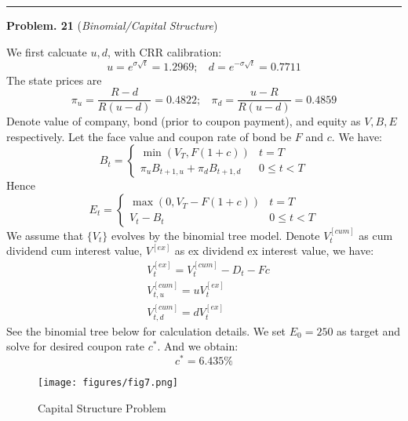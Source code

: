 \documentclass[10 pt]{hwtemplate} %
\begin{document}
\noindent\rule{16cm}{0.4pt}
\textbf{Problem. 21} (\textit{Binomial/Capital Structure})\\
\begin{solution}
We first calcuate $u,d$, with CRR calibration:
\begin{equation}
  u = e^{\sigma \sqrt{t}}=1.2969;~~~~d = e^{-\sigma \sqrt{t}}=0.7711
\end{equation}
The state prices are
\begin{equation}
  \pi_u = \frac{R-d}{R(u-d)} = 0.4822;~~~~  \pi_d = \frac{u-R}{R(u-d)} = 0.4859
\end{equation}
Denote value of company, bond (prior to coupon payment), and equity as $V, B, E$ respectively. Let the face value and coupon rate of bond be $F$ and $c$. We have:
$$
B_t = \begin{cases}\min(V_T, F(1+c)) & t=T\\
\pi_u B_{t+1, u}+\pi_d B_{t+1, d} & 0\leq t< T
\end{cases}
$$
Hence
$$
E_t =\begin{cases}\max(0, V_T - F(1+c)) & t=T \\
V_t -B_t & 0\leq t< T
\end{cases}
$$
We assume that $\{V_t\}$ evolves by the binomial tree model. Denote $V_t^{[cum]}$ as cum dividend cum interest value, $V^{[ex]}$ as ex dividend ex interest value, we have:
\begin{equation}
  \begin{split}
     &V_t^{[ex]} = V_t^{[cum]} - D_t - Fc\\
     &V_{t,u}^{[cum]} = uV_{t}^{[ex]}\\
     &V_{t,d}^{[cum]} = dV_{t}^{[ex]}
  \end{split}
\end{equation}
See the binomial tree below for calculation details. We set $E_0=250$ as target and solve for desired coupon rate $c^*$. And we obtain:
$$
c^* = 6.435\%
$$

\begin{figure}[H]
  \centering
  \captionsetup{justification=centering}
  \caption{\label{fig:q21pa}Capital Structure Problem}
  \texttt{[image: figures/fig7.png]}
\end{figure}


\end{solution}
\end{document}
